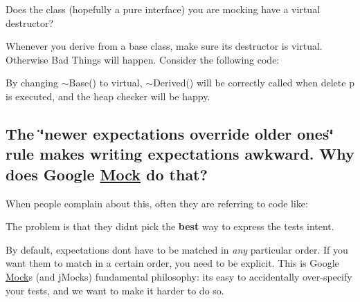 Does the class (hopefully a pure interface) you are mocking have a virtual destructor?

Whenever you derive from a base class, make sure its destructor is virtual. Otherwise Bad Things will happen. Consider the following code\+:


\begin{DoxyCode}{0}
\DoxyCodeLine{\};}
\DoxyCodeLine{}
\DoxyCodeLine{\};}
\DoxyCodeLine{}
\end{DoxyCode}


By changing {\ttfamily $\sim$\+Base()} to virtual, {\ttfamily $\sim$\+Derived()} will be correctly called when {\ttfamily delete p} is executed, and the heap checker will be happy.

\subsection*{The \char`\"{}newer expectations override older ones\char`\"{} rule makes writing expectations awkward. Why does Google \mbox{\hyperlink{class_mock}{Mock}} do that?}

When people complain about this, often they are referring to code like\+:


\begin{DoxyCode}{0}
\end{DoxyCode}


The problem is that they didn\textquotesingle{}t pick the {\bfseries{best}} way to express the test\textquotesingle{}s intent.

By default, expectations don\textquotesingle{}t have to be matched in {\itshape any} particular order. If you want them to match in a certain order, you need to be explicit. This is Google \mbox{\hyperlink{class_mock}{Mock}}\textquotesingle{}s (and j\+Mock\textquotesingle{}s) fundamental philosophy\+: it\textquotesingle{}s easy to accidentally over-\/specify your tests, and we want to make it harder to do so.

